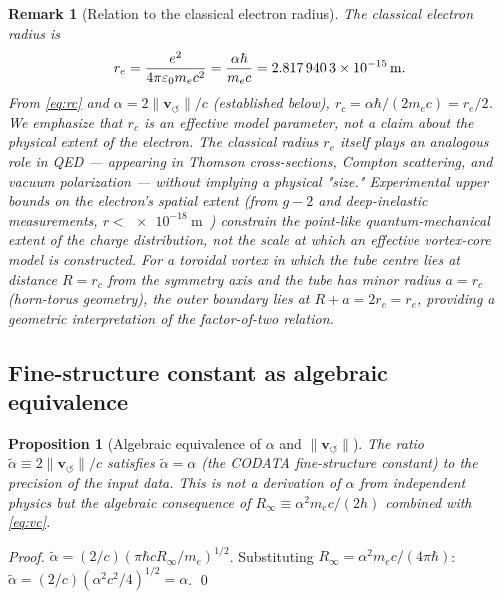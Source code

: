 \documentclass[aps,pra,preprint,longbibliography,nofootinbib]{revtex4-2}
\newtheorem{proposition}{Proposition}
\newtheorem{remark}{Remark}
\newcommand{\vnorm}{\lVert\mathbf{v}_{\!\boldsymbol{\circlearrowleft}}\rVert} %
\newcommand{\rc}{r_c}                            %
\newcommand{\Rinf}{R_\infty}                     %
\begin{document}
\begin{remark}[Relation to the classical electron radius]
\label{rem:re}
The classical electron radius is
\begin{equation}
  r_e = \frac{e^2}{4\pi\varepsilon_0 m_e c^2}
      = \frac{\alpha\hbar}{m_e c}
      = \SI{2.817\,940\,3e-15}{\meter}.
  \label{eq:re}
\end{equation}
From \eqref{eq:rc} and $\alpha = 2\vnorm/c$ (established below),
$\rc = \alpha\hbar/(2m_e c) = r_e/2$.
We emphasize that $\rc$ is an \emph{effective model parameter},
not a claim about the physical extent of the electron.
The classical radius $r_e$ itself plays an analogous role in QED
— appearing in Thomson cross-sections, Compton scattering, and
vacuum polarization — without implying a physical "size."
Experimental upper bounds on the electron's spatial extent
(from $g{-}2$ and deep-inelastic measurements,
$r < \SI{e-18}{\meter}$~\cite{PDG2022}) constrain the
\emph{point-like} quantum-mechanical extent of the charge
distribution, not the scale at which an effective vortex-core
model is constructed.
For a toroidal vortex in which the tube centre lies at distance
$R = \rc$ from the symmetry axis and the tube has minor radius
$a = \rc$ (horn-torus geometry), the outer boundary lies at
$R + a = 2\rc = r_e$, providing a geometric interpretation of
the factor-of-two relation.
\end{remark}

\subsection{Fine-structure constant as algebraic equivalence}
\label{sec:alpha}

\begin{proposition}[Algebraic equivalence of $\alpha$ and $\vnorm$]
\label{prop:alpha}
The ratio $\tilde\alpha \equiv 2\vnorm/c$
satisfies $\tilde\alpha = \alpha$ (the CODATA fine-structure
constant) to the precision of the input data.
This is not a derivation of $\alpha$ from independent physics
but the algebraic consequence of $\Rinf \equiv \alpha^2 m_e c/(2h)$
combined with \eqref{eq:vc}.
\end{proposition}

\begin{proof}
$\tilde\alpha = (2/c)(\pi\hbar c\Rinf/m_e)^{1/2}$.
Substituting $\Rinf = \alpha^2 m_e c/(4\pi\hbar)$:
$\tilde\alpha = (2/c)(\alpha^2 c^2/4)^{1/2} = \alpha$. \qed
\end{proof}
\end{document}
